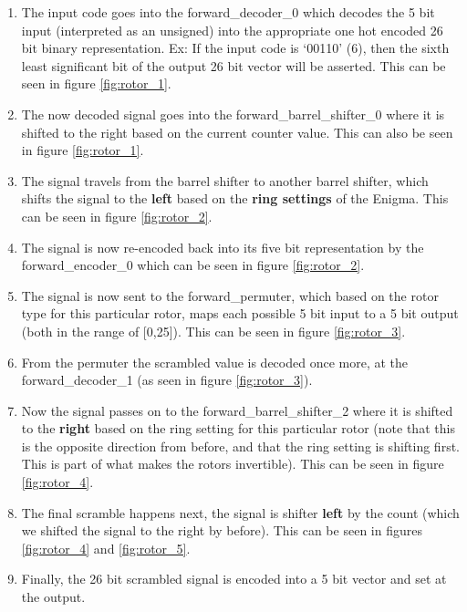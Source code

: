 \documentclass{article}
\begin{document}
\begin{enumerate}
    \item The input code goes into the forward\_decoder\_0 which decodes the 5 bit input (interpreted as an unsigned) into the appropriate one hot encoded 26 bit binary representation. Ex: If the input code is `00110' (6), then the sixth least significant bit of the output 26 bit vector will be asserted. This can be seen in figure \ref{fig:rotor_1}.
    \item The now decoded signal goes into the forward\_barrel\_shifter\_0 where it is shifted to the right based on the current counter value. This can also be seen in figure \ref{fig:rotor_1}.
    \item The signal travels from the barrel shifter to another barrel shifter, which shifts the signal to the \textbf{left} based on the \textbf{ring settings} of the Enigma. This can be seen in figure \ref{fig:rotor_2}.
    \item The signal is now re-encoded back into its five bit representation by the forward\_encoder\_0 which can be seen in figure \ref{fig:rotor_2}.
    \item The signal is now sent to the forward\_permuter, which based on the rotor type for this particular rotor, maps each possible 5 bit input to a 5 bit output (both in the range of [0,25]). This can be seen in figure \ref{fig:rotor_3}.
    \item From the permuter the scrambled value is decoded once more, at the forward\_decoder\_1 (as seen in figure \ref{fig:rotor_3}).
    \item Now the signal passes on to the forward\_barrel\_shifter\_2 where it is shifted to the \textbf{right} based on the ring setting for this particular rotor (note that this is the opposite direction from before, and that the ring setting is shifting first. This is part of what makes the rotors invertible). This can be seen in figure \ref{fig:rotor_4}.
    \item The final scramble happens next, the signal is shifter \textbf{left} by the count (which we shifted the signal to the right by before). This can be seen in figures \ref{fig:rotor_4} and \ref{fig:rotor_5}.
    \item Finally, the 26 bit scrambled signal is encoded into a 5 bit vector and set at the output. 
\end{enumerate}
\end{document}
